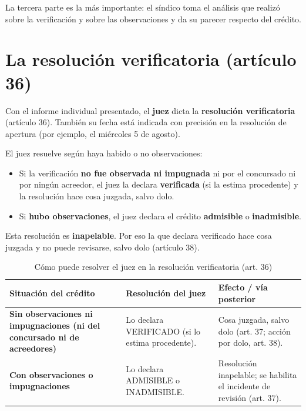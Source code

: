 \documentclass[12pt,oneside]{book}
\begin{document}
La tercera parte es la más importante: el síndico toma el análisis que realizó sobre la verificación y sobre las observaciones y da su parecer respecto del crédito.

\section{La resolución verificatoria (artículo 36)}

Con el informe individual presentado, el \textbf{juez} dicta la \textbf{resolución verificatoria} (artículo 36). También su fecha está indicada con precisión en la resolución de apertura (por ejemplo, el miércoles 5 de agosto).

El juez resuelve según haya habido o no observaciones:

\begin{itemize}
    \item Si la verificación \textbf{no fue observada ni impugnada} ni por el concursado ni por ningún acreedor, el juez la declara \textbf{verificada} (si la estima procedente) y la resolución hace cosa juzgada, salvo dolo.
    \item Si \textbf{hubo observaciones}, el juez declara el crédito \textbf{admisible} o \textbf{inadmisible}.
\end{itemize}

Esta resolución es \textbf{inapelable}. Por eso la que declara verificado hace cosa juzgada y no puede revisarse, salvo dolo (artículo 38).

\begin{table}[H]
\centering
\small
\caption{Cómo puede resolver el juez en la resolución verificatoria (art. 36)}
\begin{tabularx}{\textwidth}{>{\raggedright\arraybackslash\bfseries}p{3.6cm}>{\raggedright\arraybackslash}X>{\raggedright\arraybackslash}X}
\toprule
\textbf{Situación del crédito} & \textbf{Resolución del juez} & \textbf{Efecto / vía posterior} \\
\midrule
Sin observaciones ni impugnaciones (ni del concursado ni de acreedores) & Lo declara VERIFICADO (si lo estima procedente). & Cosa juzgada, salvo dolo (art. 37; acción por dolo, art. 38). \\
\addlinespace
Con observaciones o impugnaciones & Lo declara ADMISIBLE o INADMISIBLE. & Resolución inapelable; se habilita el incidente de revisión (art. 37). \\
\bottomrule
\end{tabularx}
\end{table}
\end{document}
